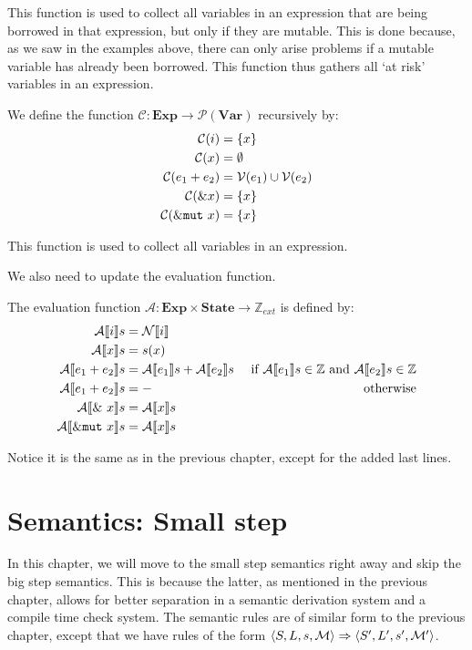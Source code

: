 This function is used to collect all variables in an expression that are being borrowed in that expression, but only if they are mutable. This is done because, as we saw in the examples above, there can only arise problems if a mutable variable has already been borrowed. This function thus gathers all `at risk' variables in an expression. 

\begin{definition}
We define the function $\mathcal{C}: \textbf{Exp} \to \mathcal{P}(\textbf{Var})$ recursively by:
\begin{align*}
    \mathcal{C}(i)          &= \{ x \}
\\  \mathcal{C}(x)          &= \emptyset
\\  \mathcal{C}(e_1 + e_2)  &= \mathcal{V}(e_1) \cup \mathcal{V}(e_2)
\\  \mathcal{C}(\& x)       &= \{ x \}
\\  \mathcal{C}(\& \texttt{mut} ~x)       &= \{ x \}
\end{align*}
\end{definition}

This function is used to collect all variables in an expression. 

We also need to update the evaluation function. 
\begin{definition}
The evaluation function $\mathcal{A}: \textbf{Exp} \times \textbf{State} \to \mathbb{Z}_{ext}$ is defined by:
\begin{align*}
    \mathcal{A} \llbracket i \rrbracket s          &= \mathcal{N} \llbracket i \rrbracket &
\\  \mathcal{A} \llbracket x \rrbracket s          &= s(x) &
\\  \mathcal{A} \llbracket e_1 + e_2 \rrbracket s  &= \mathcal{A} \llbracket e_1 \rrbracket s + \mathcal{A} \llbracket e_2 \rrbracket s & \textrm{ if } \mathcal{A} \llbracket e_1 \rrbracket s \in \mathbb{Z} \textrm{ and } \mathcal{A} \llbracket e_2 \rrbracket s \in \mathbb{Z}
\\  \mathcal{A} \llbracket e_1 + e_2 \rrbracket s  &= - & \textrm{ otherwise}
\\ \mathcal{A} \llbracket \&~x \rrbracket s       &= \mathcal{A} \llbracket x \rrbracket s &
\\ \mathcal{A} \llbracket \&\texttt{mut}~x \rrbracket s       &= \mathcal{A} \llbracket x \rrbracket s &
\end{align*}
\end{definition}
Notice it is the same as in the previous chapter, except for the added last lines. 

\section{Semantics: Small step}
In this chapter, we will move to the small step semantics right away and skip the big step semantics. This is because the latter, as mentioned in the previous chapter, allows for better separation in a semantic derivation system and a compile time check system. The semantic rules are of similar form to the previous chapter, except that we have rules of the form $\langle S, L, s, \mathcal{M} \rangle \Rightarrow \langle S', L', s', \mathcal{M'} \rangle$.

